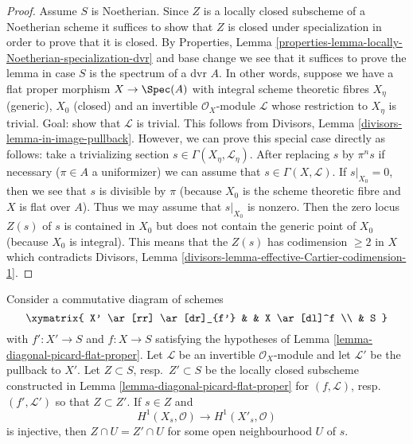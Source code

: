 \begin{proof}
\medskip\noindent
Assume $S$ is Noetherian. Since $Z$ is a locally closed subscheme of a
Noetherian scheme it suffices to show that $Z$ is closed under specialization
in order to prove that it is closed. By
Properties, Lemma \ref{properties-lemma-locally-Noetherian-specialization-dvr}
and base change we see that it suffices to prove the lemma in
case $S$ is the spectrum of a dvr $A$. In other words, suppose
we have a flat proper morphism $X \to \Spec(A)$ with integral
scheme theoretic fibres $X_\eta$ (generic), $X_0$ (closed) and an invertible
$\mathcal{O}_X$-module $\mathcal{L}$ whose restriction to $X_\eta$ is
trivial. Goal: show that $\mathcal{L}$ is trivial. This follows
from Divisors, Lemma \ref{divisors-lemma-in-image-pullback}.
However, we can prove this special case directly as follows:
take a trivializing section $s \in \Gamma(X_\eta, \mathcal{L}_\eta)$.
After replacing $s$ by $\pi^n s$ if necessary ($\pi \in A$ a uniformizer)
we can assume that $s \in \Gamma(X, \mathcal{L})$.
If $s|_{X_0} = 0$, then we see
that $s$ is divisible by $\pi$ (because $X_0$ is the scheme theoretic
fibre and $X$ is flat over $A$). Thus we may assume that $s|_{X_0}$
is nonzero. Then the zero locus $Z(s)$ of $s$ is contained in $X_0$
but does not contain the generic point of $X_0$ (because $X_0$ is integral).
This means that the $Z(s)$ has codimension $\geq 2$ in $X$ which contradicts
Divisors, Lemma \ref{divisors-lemma-effective-Cartier-codimension-1}.
\end{proof}

\begin{lemma}
\label{lemma-H1-O-picard-flat-proper}
Consider a commutative diagram of schemes
$$
\xymatrix{
X' \ar[rr] \ar[dr]_{f'} & & X \ar[dl]^f \\
& S
}
$$
with $f' : X' \to S$ and $f : X \to S$ satisfying the hypotheses of
Lemma \ref{lemma-diagonal-picard-flat-proper}.
Let $\mathcal{L}$ be an invertible $\mathcal{O}_X$-module
and let $\mathcal{L}'$ be the pullback to $X'$. Let $Z \subset S$,
resp.\ $Z' \subset S$ be the locally closed subscheme constructed
in Lemma \ref{lemma-diagonal-picard-flat-proper}
for $(f, \mathcal{L})$, resp.\ $(f', \mathcal{L}')$
so that $Z \subset Z'$. If $s \in Z$ and
$$
H^1(X_s, \mathcal{O}) \longrightarrow H^1(X'_s, \mathcal{O})
$$
is injective, then $Z \cap U = Z' \cap U$ for some open neighbourhood
$U$ of $s$.
\end{lemma}

